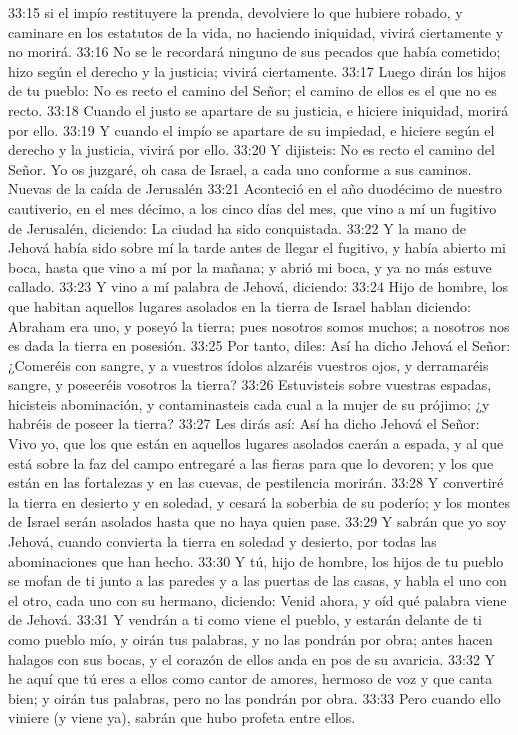 33:15 si el impío restituyere la prenda, devolviere lo que hubiere robado, y caminare en los estatutos de la vida, no haciendo iniquidad, vivirá ciertamente y no morirá.  
33:16 No se le recordará ninguno de sus pecados que había cometido; hizo según el derecho y la justicia; vivirá ciertamente.  
33:17 Luego dirán los hijos de tu pueblo: No es recto el camino del Señor; el camino de ellos es el que no es recto.  
33:18 Cuando el justo se apartare de su justicia, e hiciere iniquidad, morirá por ello.  
33:19 Y cuando el impío se apartare de su impiedad, e hiciere según el derecho y la justicia, vivirá por ello.  
33:20 Y dijisteis: No es recto el camino del Señor. Yo os juzgaré, oh casa de Israel, a cada uno conforme a sus caminos.  
Nuevas de la caída de Jerusalén  
33:21 Aconteció en el año duodécimo de nuestro cautiverio, en el mes décimo, a los cinco días del mes, que vino a mí un fugitivo de Jerusalén, diciendo: La ciudad ha sido conquistada. 
33:22 Y la mano de Jehová había sido sobre mí la tarde antes de llegar el fugitivo, y había abierto mi boca, hasta que vino a mí por la mañana; y abrió mi boca, y ya no más estuve callado.  
33:23 Y vino a mí palabra de Jehová, diciendo:  
33:24 Hijo de hombre, los que habitan aquellos lugares asolados en la tierra de Israel hablan diciendo: Abraham era uno, y poseyó la tierra; pues nosotros somos muchos; a nosotros nos es dada la tierra en posesión.  
33:25 Por tanto, diles: Así ha dicho Jehová el Señor: ¿Comeréis con sangre, y a vuestros ídolos alzaréis vuestros ojos, y derramaréis sangre, y poseeréis vosotros la tierra?  
33:26 Estuvisteis sobre vuestras espadas, hicisteis abominación, y contaminasteis cada cual a la mujer de su prójimo; ¿y habréis de poseer la tierra?  
33:27 Les dirás así: Así ha dicho Jehová el Señor: Vivo yo, que los que están en aquellos lugares asolados caerán a espada, y al que está sobre la faz del campo entregaré a las fieras para que lo devoren; y los que están en las fortalezas y en las cuevas, de pestilencia morirán.  
33:28 Y convertiré la tierra en desierto y en soledad, y cesará la soberbia de su poderío; y los montes de Israel serán asolados hasta que no haya quien pase.  
33:29 Y sabrán que yo soy Jehová, cuando convierta la tierra en soledad y desierto, por todas las abominaciones que han hecho.  
33:30 Y tú, hijo de hombre, los hijos de tu pueblo se mofan de ti junto a las paredes y a las puertas de las casas, y habla el uno con el otro, cada uno con su hermano, diciendo: Venid ahora, y oíd qué palabra viene de Jehová.  
33:31 Y vendrán a ti como viene el pueblo, y estarán delante de ti como pueblo mío, y oirán tus palabras, y no las pondrán por obra; antes hacen halagos con sus bocas, y el corazón de ellos anda en pos de su avaricia.  
33:32 Y he aquí que tú eres a ellos como cantor de amores, hermoso de voz y que canta bien; y oirán tus palabras, pero no las pondrán por obra.  
33:33 Pero cuando ello viniere (y viene ya), sabrán que hubo profeta entre ellos.  

